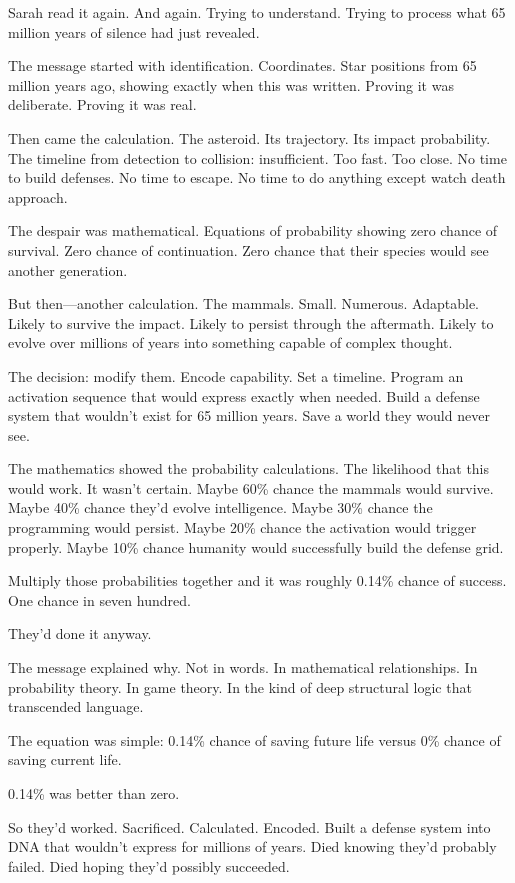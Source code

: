 Sarah read it again. And again. Trying to understand. Trying to process what 65 million years of silence had just revealed.

The message started with identification. Coordinates. Star positions from 65 million years ago, showing exactly when this was written. Proving it was deliberate. Proving it was real.

Then came the calculation. The asteroid. Its trajectory. Its impact probability. The timeline from detection to collision: insufficient. Too fast. Too close. No time to build defenses. No time to escape. No time to do anything except watch death approach.

The despair was mathematical. Equations of probability showing zero chance of survival. Zero chance of continuation. Zero chance that their species would see another generation.

But then—another calculation. The mammals. Small. Numerous. Adaptable. Likely to survive the impact. Likely to persist through the aftermath. Likely to evolve over millions of years into something capable of complex thought.

The decision: modify them. Encode capability. Set a timeline. Program an activation sequence that would express exactly when needed. Build a defense system that wouldn't exist for 65 million years. Save a world they would never see.

The mathematics showed the probability calculations. The likelihood that this would work. It wasn't certain. Maybe 60\% chance the mammals would survive. Maybe 40\% chance they'd evolve intelligence. Maybe 30\% chance the programming would persist. Maybe 20\% chance the activation would trigger properly. Maybe 10\% chance humanity would successfully build the defense grid.

Multiply those probabilities together and it was roughly 0.14\% chance of success. One chance in seven hundred.

They'd done it anyway.

The message explained why. Not in words. In mathematical relationships. In probability theory. In game theory. In the kind of deep structural logic that transcended language.

The equation was simple: 0.14\% chance of saving future life versus 0\% chance of saving current life.

0.14\% was better than zero.

So they'd worked. Sacrificed. Calculated. Encoded. Built a defense system into DNA that wouldn't express for millions of years. Died knowing they'd probably failed. Died hoping they'd possibly succeeded.

